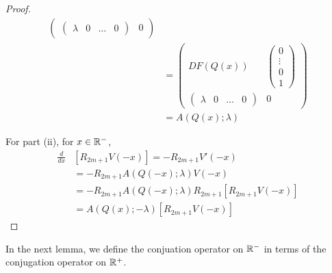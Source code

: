 \documentclass[thesis.tex]{subfiles}
\begin{document}
\begin{lemma}
\begin{proof}
\begin{align*}
\begin{pmatrix}
\begin{pmatrix} \lambda & 0 & \dots & 0 \end{pmatrix} & 0
\end{pmatrix} \\
&= \begin{pmatrix}
DF(Q(x)) & \begin{pmatrix} 0 \\ \vdots \\ 0 \\ 1 \end{pmatrix} \\
\begin{pmatrix} \lambda & 0 & \dots & 0 \end{pmatrix} & 0
\end{pmatrix} \\ 
&= A(Q(x); \lambda)
\end{align*}

For part (ii), for $x \in \mathbb{R}^-$,
\begin{align*}
\frac{d}{dx} &\left[ R_{2m+1} V(-x) \right] = -R_{2m+1} V'(-x) \\
&= -R_{2m+1} A(Q(-x); \lambda) V(-x) \\
&= -R_{2m+1} A(Q(-x); \lambda) R_{2m+1} [ R_{2m+1} V(-x)] \\
&= A(Q(x); -\lambda) [R_{2m+1} V(-x)]
\end{align*}
\end{proof}
\end{lemma}

In the next lemma, we define the conjuation operator on $\mathbb{R}^-$ in terms of the conjugation operator on $\mathbb{R}^+$.
\end{document}
